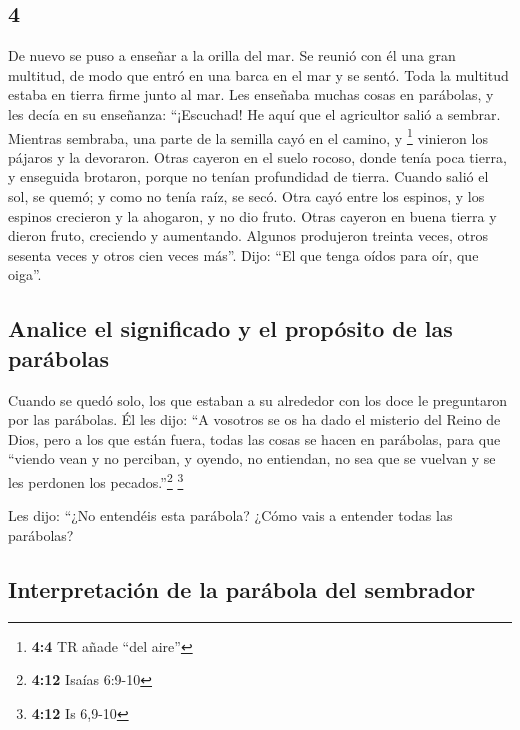\begin{paracol}{2}
\hypertarget{section-6}{%
\section{4}\label{section-6}}

 De nuevo se puso a enseñar a la orilla del mar. Se reunió
con él una gran multitud, de modo que entró en una barca en el mar y se
sentó. Toda la multitud estaba en tierra firme junto al mar.
 Les enseñaba muchas cosas en parábolas, y les decía en su
enseñanza:  ``¡Escuchad! He aquí que el agricultor salió a
sembrar.  Mientras sembraba, una parte de la semilla cayó
en el camino, y \footnote{\textbf{4:4} TR añade ``del aire''} vinieron
los pájaros y la devoraron.  Otras cayeron en el suelo
rocoso, donde tenía poca tierra, y enseguida brotaron, porque no tenían
profundidad de tierra.  Cuando salió el sol, se quemó; y
como no tenía raíz, se secó.  Otra cayó entre los espinos,
y los espinos crecieron y la ahogaron, y no dio fruto. 
Otras cayeron en buena tierra y dieron fruto, creciendo y aumentando.
Algunos produjeron treinta veces, otros sesenta veces y otros cien veces
más''.  Dijo: ``El que tenga oídos para oír, que oiga''.

\hypertarget{analice-el-significado-y-el-propuxf3sito-de-las-paruxe1bolas}{%
\subsection{Analice el significado y el propósito de las
parábolas}\label{analice-el-significado-y-el-propuxf3sito-de-las-paruxe1bolas}}

 Cuando se quedó solo, los que estaban a su alrededor con
los doce le preguntaron por las parábolas.  Él les dijo:
``A vosotros se os ha dado el misterio del Reino de Dios, pero a los que
están fuera, todas las cosas se hacen en parábolas,  para
que ``viendo vean y no perciban, y oyendo, no entiendan, no sea que se
vuelvan y se les perdonen los pecados.''\footnote{\textbf{4:12} Isaías
  6:9-10} \footnote{\textbf{4:12} Is 6,9-10}

 Les dijo: ``¿No entendéis esta parábola? ¿Cómo vais a
entender todas las parábolas?

\hypertarget{interpretaciuxf3n-de-la-paruxe1bola-del-sembrador}{%
\subsection{Interpretación de la parábola del
sembrador}\label{interpretaciuxf3n-de-la-paruxe1bola-del-sembrador}}


\end{paracol}

